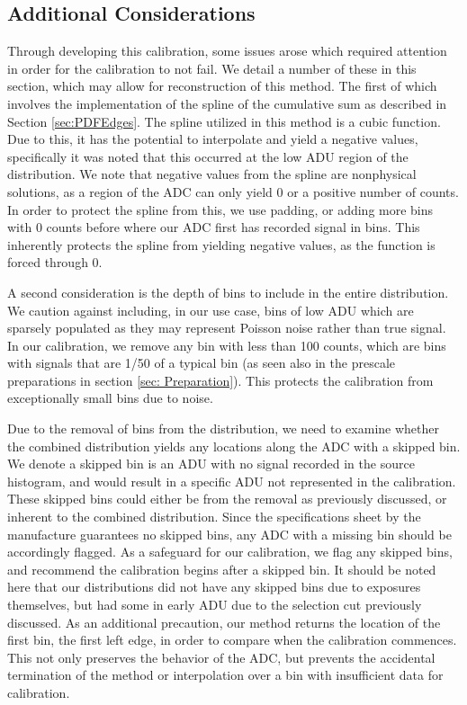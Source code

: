 \documentclass[11pt, letterpaper]{article}
\begin{document}
\subsection{Additional Considerations} 
\label{sec: AD}
\indent 


Through developing this calibration, some issues arose which required attention in order for the calibration to not fail. 
We detail a number of these in this section, which may allow for reconstruction of this method. 
\indent 
The first of which involves the implementation of the spline of the cumulative sum as described in Section \ref{sec:PDFEdges}. 
The spline utilized in this method is a cubic function. 
Due to this, it has the potential to interpolate and yield a negative values, specifically it was noted that this occurred at the low ADU region of the distribution. 
We note that negative values from the spline are nonphysical solutions, as a region of the ADC can only yield 0 or a positive number of counts. 
In order to protect the spline from this, we use padding, or adding more bins with 0 counts before where our ADC first has recorded signal in bins. 
This inherently protects the spline from yielding negative values, as the function is forced through 0. 
\indent 

A second consideration is the depth of bins to include in the entire distribution. 
We caution against including, in our use case, bins of low ADU which are sparsely populated as they may represent Poisson noise rather than true signal. 
In our calibration, we remove any bin with less than 100 counts, which are bins with signals that are 1/50 of a typical bin (as seen also in the prescale preparations in section \ref{sec: Preparation}). 
This protects the calibration from exceptionally small bins due to noise.
\indent

Due to the removal of bins from the distribution, we need to examine whether the combined distribution yields any locations along the ADC with a skipped bin. 
We denote a skipped bin is an ADU with no signal recorded in the source histogram, and would result in a specific ADU not represented in the calibration. 
These skipped bins could either be from the removal as previously discussed, or inherent to the combined distribution. 
Since the specifications sheet by the manufacture guarantees no skipped bins, any ADC with a missing bin should be accordingly flagged. 
As a safeguard for our calibration, we flag any skipped bins, and recommend the calibration begins after a skipped bin. 
It should be noted here that our distributions did not have any skipped bins due to exposures themselves, but had some in early ADU due to the selection cut previously discussed. 
As an additional precaution, our method returns the location of the first bin, the first left edge, in order to compare when the calibration commences. 
This not only preserves the behavior of the ADC, but prevents the accidental termination of the method or interpolation over a bin with insufficient data for calibration. 
\indent 
\end{document}
